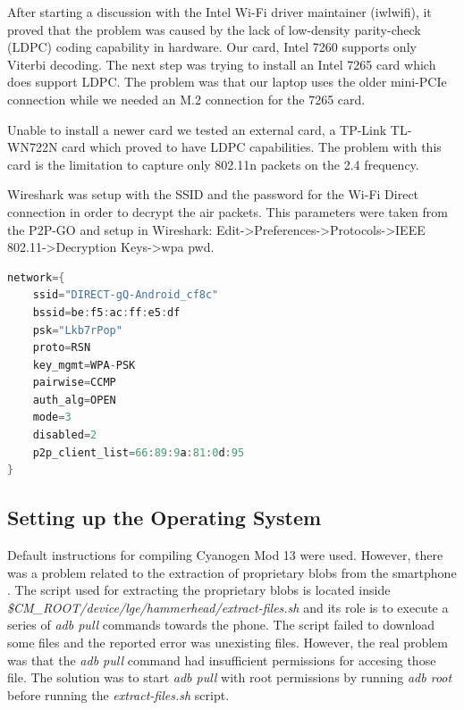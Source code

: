 
After starting a discussion \cite{cite-monitordiscussion} with the Intel Wi-Fi driver maintainer (iwlwifi), it proved that the problem was caused by the lack of low-density parity-check (LDPC) coding capability in hardware. Our card, Intel 7260 supports only Viterbi decoding. The next step was trying to install an Intel 7265 card which does support LDPC. The problem was that our laptop uses the older mini-PCIe connection while we needed an M.2 connection for the 7265 card.

Unable to install a newer card we tested an external card, a TP-Link TL-WN722N card \cite{cite-tplink} which proved to have LDPC capabilities. The problem with this card is the limitation to capture only 802.11n packets on the 2.4 frequency.

Wireshark was setup with the SSID and the password for the Wi-Fi Direct connection in order to decrypt the air packets. This parameters were taken from the P2P-GO and setup in Wireshark: Edit->Preferences->Protocols->IEEE 802.11->Decryption Keys->wpa pwd.

\begin{lstlisting}[language=C, frame=single, caption={Listing from /data/misc/wifi/p2p_supplicant.conf on the P2P GO},label=p2p_supplicant]
network={
	ssid="DIRECT-gQ-Android_cf8c"
	bssid=be:f5:ac:ff:e5:df
	psk="Lkb7rPop"
	proto=RSN
	key_mgmt=WPA-PSK
	pairwise=CCMP
	auth_alg=OPEN
	mode=3
	disabled=2
	p2p_client_list=66:89:9a:81:0d:95
}
\end{lstlisting}

\subsection{Setting up the Operating System}
\label{sub-sec:proj-scopenexus5operatingsystem}

Default instructions \cite{cite-compilingcm13} for compiling Cyanogen Mod 13 were used. However, there was a problem related to the extraction of proprietary blobs from the smartphone \cite{cite-proprietaryblobs}. The script used for extracting the proprietary blobs is located inside \textit{\$CM_ROOT/device/lge/hammerhead/extract-files.sh} and its role is to execute a series of \textit{adb pull} commands towards the phone. The script failed to download some files and the reported error was unexisting files. However, the real problem was that the \textit{adb pull} command had insufficient permissions for accesing those file. The solution was to start \textit{adb pull} with root permissions by running \textit{adb root} before running the \textit{extract-files.sh} script.

